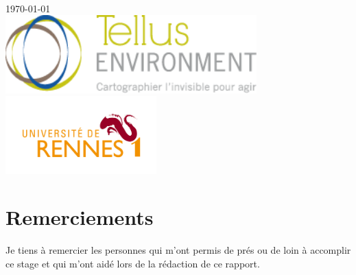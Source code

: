 \documentclass[12pt,a4paper]{report}
\begin{document}
\begin{titlepage}
\begin{minipage}{0.4\textwidth}
\end{minipage}\\[1cm]



{\large \today}\\[1cm] %

\includegraphics[height=3cm]{img/logo-tellusenv.png} \\
\includegraphics[height=3cm]{img/univ.jpeg}\\[1cm] %
 

\vfill %

\end{titlepage}

\tableofcontents
\newpage

\chapter{Remerciements}
Je tiens à remercier les personnes qui m'ont permis de prés ou de loin à accomplir ce stage et qui m'ont aidé lors de la rédaction de ce rapport.
\end{document}
